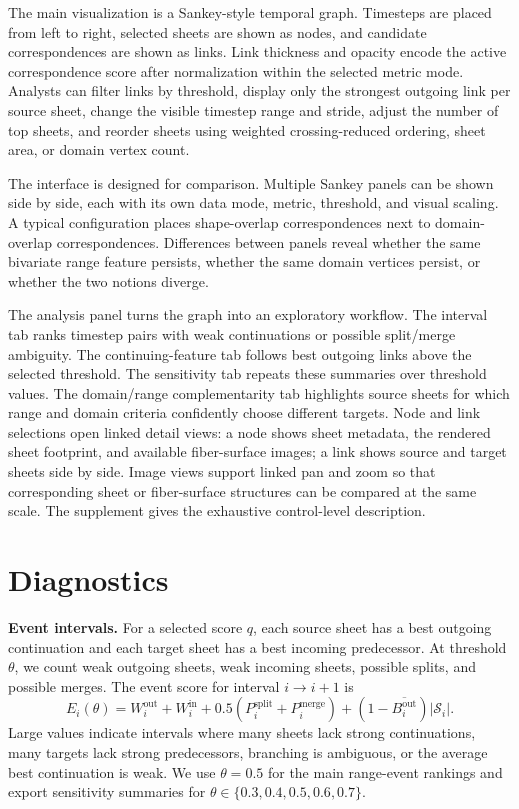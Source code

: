\documentclass{vgtc}
\newcommand{\Sheets}{\mathcal{S}}
\newcommand{\myparagraph}[1]{\vspace{1mm} \noindent \textbf{#1}}
\begin{document}
The main visualization is a Sankey-style temporal graph. Timesteps are placed from left to right, selected sheets are shown as nodes, and candidate correspondences are shown as links. Link thickness and opacity encode the active correspondence score after normalization within the selected metric mode. Analysts can filter links by threshold, display only the strongest outgoing link per source sheet, change the visible timestep range and stride, adjust the number of top sheets, and reorder sheets using weighted crossing-reduced ordering, sheet area, or domain vertex count.

The interface is designed for comparison. Multiple Sankey panels can be shown side by side, each with its own data mode, metric, threshold, and visual scaling. A typical configuration places shape-overlap correspondences next to domain-overlap correspondences. Differences between panels reveal whether the same bivariate range feature persists, whether the same domain vertices persist, or whether the two notions diverge.

The analysis panel turns the graph into an exploratory workflow. The interval tab ranks timestep pairs with weak continuations or possible split/merge ambiguity. The continuing-feature tab follows best outgoing links above the selected threshold. The sensitivity tab repeats these summaries over threshold values. The domain/range complementarity tab highlights source sheets for which range and domain criteria confidently choose different targets. Node and link selections open linked detail views: a node shows sheet metadata, the rendered sheet footprint, and available fiber-surface images; a link shows source and target sheets side by side. Image views support linked pan and zoom so that corresponding sheet or fiber-surface structures can be compared at the same scale. The supplement gives the exhaustive control-level description.

\section{Diagnostics}

\myparagraph{Event intervals.}
For a selected score $q$, each source sheet has a best outgoing continuation and each target sheet has a best incoming predecessor. At threshold $\theta$, we count weak outgoing sheets, weak incoming sheets, possible splits, and possible merges. The event score for interval $i\rightarrow i+1$ is
$$
E_i(\theta)=
W^\mathrm{out}_i + W^\mathrm{in}_i
+0.5(P^\mathrm{split}_i+P^\mathrm{merge}_i)
+(1-\overline{B^\mathrm{out}_i})|\Sheets_i|.
$$
Large values indicate intervals where many sheets lack strong continuations, many targets lack strong predecessors, branching is ambiguous, or the average best continuation is weak. We use $\theta=0.5$ for the main range-event rankings and export sensitivity summaries for $\theta\in\{0.3,0.4,0.5,0.6,0.7\}$.
\end{document}

